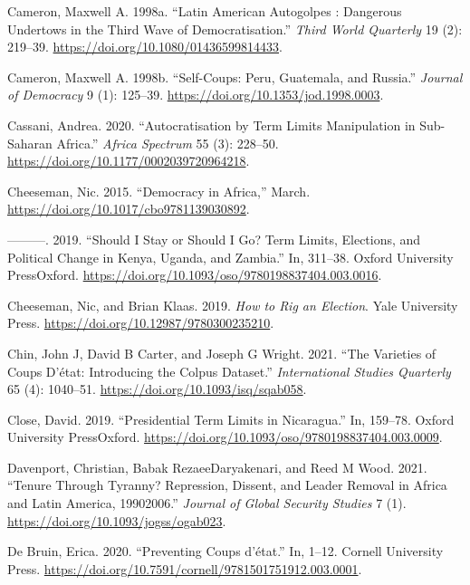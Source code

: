 \documentclass[
  12pt,
]{report}
\newlength{\cslhangindent}
\newenvironment{CSLReferences}[2] %
 {\begin{list}{}{%
  \setlength{\itemindent}{0pt}
  \setlength{\leftmargin}{0pt}
  \setlength{\parsep}{0pt}
  \ifodd #1
   \setlength{\leftmargin}{\cslhangindent}
   \setlength{\itemindent}{-1\cslhangindent}
  \fi
  \setlength{\itemsep}{#2\baselineskip}}}
 {\end{list}}
\begin{document}
\begin{CSLReferences}{1}{0}
Cameron, Maxwell A. 1998a. {``Latin American Autogolpes : Dangerous
Undertows in the Third Wave of Democratisation.''} \emph{Third World
Quarterly} 19 (2): 219--39.
\url{https://doi.org/10.1080/01436599814433}.

Cameron, Maxwell A. 1998b. {``Self-Coups: Peru, Guatemala, and
Russia.''} \emph{Journal of Democracy} 9 (1): 125--39.
\url{https://doi.org/10.1353/jod.1998.0003}.

Cassani, Andrea. 2020. {``Autocratisation by Term Limits Manipulation in
Sub-Saharan Africa.''} \emph{Africa Spectrum} 55 (3): 228--50.
\url{https://doi.org/10.1177/0002039720964218}.

Cheeseman, Nic. 2015. {``Democracy in Africa,''} March.
\url{https://doi.org/10.1017/cbo9781139030892}.

---------. 2019. {``Should I Stay or Should I Go? Term Limits,
Elections, and Political Change in Kenya, Uganda, and Zambia.''} In,
311--38. Oxford University PressOxford.
\url{https://doi.org/10.1093/oso/9780198837404.003.0016}.

Cheeseman, Nic, and Brian Klaas. 2019. \emph{How to Rig an Election}.
Yale University Press. \url{https://doi.org/10.12987/9780300235210}.

Chin, John J, David B Carter, and Joseph G Wright. 2021. {``The
Varieties of Coups D{'}état: Introducing the Colpus Dataset.''}
\emph{International Studies Quarterly} 65 (4): 1040--51.
\url{https://doi.org/10.1093/isq/sqab058}.

Close, David. 2019. {``Presidential Term Limits in Nicaragua.''} In,
159--78. Oxford University PressOxford.
\url{https://doi.org/10.1093/oso/9780198837404.003.0009}.

Davenport, Christian, Babak RezaeeDaryakenari, and Reed M Wood. 2021.
{``Tenure Through Tyranny? Repression, Dissent, and Leader Removal in
Africa and Latin America, 1990{\textendash}2006.''} \emph{Journal of
Global Security Studies} 7 (1).
\url{https://doi.org/10.1093/jogss/ogab023}.

De Bruin, Erica. 2020. {``Preventing Coups d{'}état.''} In, 1--12.
Cornell University Press.
\url{https://doi.org/10.7591/cornell/9781501751912.003.0001}.


\end{CSLReferences}
\end{document}
